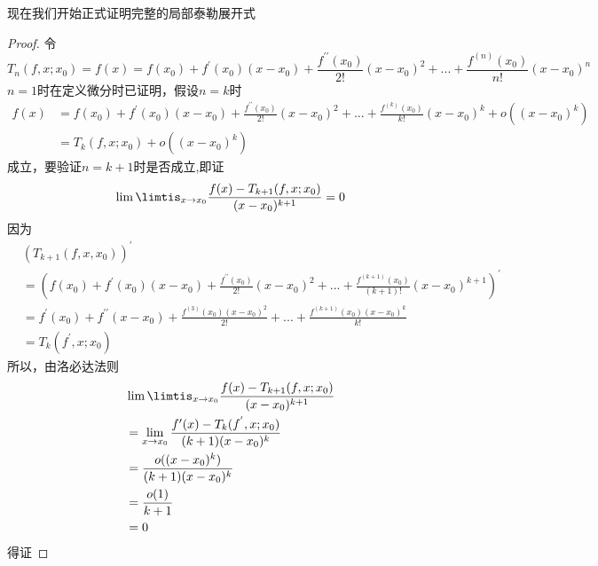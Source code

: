 \documentclass[12pt, a4paper, oneside]{ctexart}
\begin{document}
现在我们开始正式证明完整的局部泰勒展开式
\begin{proof}
令
\begin{equation}
    T_n(f,x;x_0)=f(x)=f(x_0)+f^{\prime}(x_0)(x-x_0)+\frac{f^{\prime \prime }(x_0)}{2!}(x-x_0)^{2}+...+\frac{f^{(n)}(x_0)}{n!}(x-x_0)^{n}
\end{equation}
$n=1$时在定义微分时已证明，假设$n=k$时
\begin{equation}
\begin{aligned}
    f(x)&=f(x_0)+f^{\prime}(x_0)(x-x_0)+\frac{f^{\prime \prime }(x_0)}{2!}(x-x_0)^{2}+...+\frac{f^{(k)}(x_0)}{k!}(x-x_0)^{k}+o((x-x_0)^{k})\\
    &=T_k(f,x;x_0)+o((x-x_0)^{k})
    \end{aligned}
\end{equation}
成立，要验证$n=k+1$时是否成立,即证
\begin{equation}
   \lim\limtis_{x \to x_0}\frac{f(x)-T_{k+1}(f,x;x_0)}{(x-x_0)^{k+1}}=0
\end{equation}
因为
\begin{equation}
    \begin{aligned}
         &(T_{k+1}(f,x,x_0))^{\prime}\\
         &=(f(x_0)+f^{\prime}(x_0)(x-x_0)+\frac{f^{\prime \prime }(x_0)}{2!}(x-x_0)^{2}+...+\frac{f^{(k+1)}(x_0)}{(k+1)!}(x-x_0)^{k+1})^{\prime}\\
         &=f^{\prime }(x_0)+f^{\prime \prime  }(x-x_0)+\frac{f^{(3)}(x_0)(x-x_0)^{2}}{2!}+...+\frac{f^{(k+1)}(x_0)(x-x_0)^{k}}{k!}\\
         &=T_{k}(f^{'},x;x_0)
    \end{aligned}
\end{equation}
所以，由洛必达法则
\begin{equation}
    \begin{aligned}
         &\lim\limtis_{x \to x_0}\frac{f(x)-T_{k+1}(f,x;x_0)}{(x-x_0)^{k+1}}\\
         &=\lim\limits_{x\to x_0}\frac{f^{\prime}(x)-T_{k}(f^{'},x;x_0)}{(k+1)(x-x_0)^{k}}\\
         &=\frac{o((x-x_0)^{k})}{(k+1)(x-x_0)^{k}}\\
         &=\frac{o(1)}{k+1}\\
         &=0
    \end{aligned}
\end{equation}
得证
\end{proof}
\end{document}
